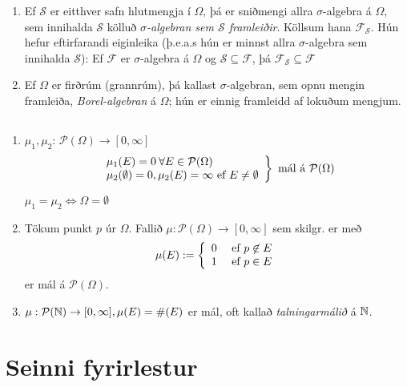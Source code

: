 \documentclass[12pt]{book}
\newcommand{\cP}{\mathcal{P}}
\newcommand{\cF}{\mathcal{F}}
\newcommand{\cS}{\mathcal{S}}
\begin{document}
\begin{enumerate}
\item Ef $\cS$ er eitthver safn hlutmengja í $\Omega$, þá er sniðmengi allra $\sigma$-algebra á $\Omega$, sem
  innihalda $\cS$ kölluð \emph{$\sigma$-algebran sem $\cS$ framleiðir}.
  Köllsum hana $\cF_{\cS}$. Hún hefur eftirfarandi eiginleika (þ.e.a.s hún er minnst allra
  $\sigma$-algebra sem innihalda $\cS$): Ef $\cF$ er $\sigma$-algebra á $\Omega$ og $\cS \subseteq \cF$, þá
  $\cF_{\cS} \subseteq \cF$


\item  Ef $\Omega$ er firðrúm (grannrúm), þá kallast $\sigma$-algebran, sem opnu mengin framleiða,
  \emph{Borel-algebran} á $\Omega$; hún er einnig framleidd af lokuðum mengjum.
\end{enumerate}

\subsection{}

\begin{daemi}
  \begin{enumerate}[\arabic*.]
  \item $\mu_1, \mu_2$: $\cP(\Omega) \to [0, \infty]$
    \[ \left. \begin{array}{l}
                \mu_1 (E) = 0 \: \forall E \in \cP(\Omega)\\
                \mu_2 (\emptyset) = 0, \mu_2(E) = \infty \Ef E \neq \emptyset \\
                \end{array}
                \right\} \text{ mál á $\cP(\Omega)$}
                \]
              \begin{ath}
                $\mu_1 = \mu_2 \Leftrightarrow \Omega = \emptyset$
              \end{ath}


            \item Tökum punkt $p$ úr $\Omega$. Fallið $\mu: \cP(\Omega) \to [0,\infty]$
sem skilgr. er með \[ \mu(E) := \left\{ \begin{array}{l l} 0 & \text{ ef } p \not\in E\\ 1 & \text{ ef } p \in E \end{array} \right. \]
er mál á $\cP(\Omega)$.

\item $\mu: \cP(\N) \to [0, \infty], \mu(E) = \#(E)$ er mál, oft kallað \emph{talningarmálið} á $\mathbb{N}$.
              \end{enumerate}

  
\end{daemi}

\section{Seinni fyrirlestur}
\end{document}
